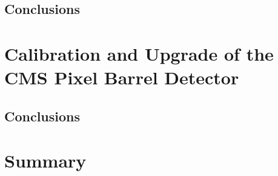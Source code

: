 \documentclass[a4paper, 11pt, twoside, openany]{ThesisStyle}
\begin{document}
			
	
	

	

	

\chapter{Conclusions}

\part{Calibration and Upgrade of the CMS Pixel Barrel Detector}

	

	
					
\chapter{Conclusions}

\part{Summary}					

%
%
\newpage
\thispagestyle{empty}
\mbox{}
%

%
%
%
%
%

%
\end{document}
